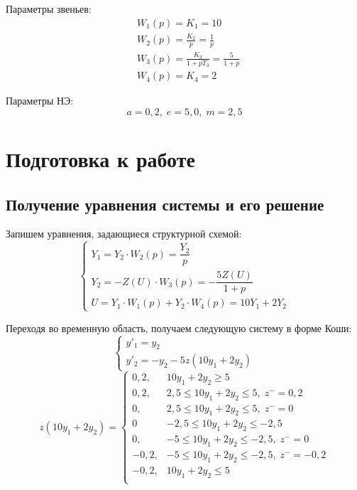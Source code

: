 	Параметры звеньев:
	\begin{align*}
		& W_1(p) = K_1 = 10 \\
		& W_2(p) = \frac{K_2}{p} = \frac{1}{p} \\
		& W_3(p) = \frac{K_3}{1+pT_3} = \frac{5}{1+p} \\
		& W_4(p) = K_4 = 2
	\end{align*}
	
	Параметры НЭ:
	\begin{equation*}
		a = 0,2,\;e=5,0,\;m=2,5
	\end{equation*}


	\section{Подготовка к работе}
	\subsection{Получение уравнения системы и его решение}
	
	Запишем уравнения, задающиеся структурной схемой:
	\begin{equation*}
		\begin{cases}
			Y_1 = Y_2\cdot W_2(p) = \dfrac{Y_2}{p} \\
			Y_2 = -Z(U)\cdot W_3(p) = -\dfrac{5 Z(U)}{1+p} \\
			U = Y_1\cdot W_1(p) + Y_2 \cdot W_4(p) = 10Y_1 + 2Y_2
		\end{cases}
	\end{equation*}

	Переходя во временную область, получаем следующую систему в форме Коши:
	\begin{equation}
		\begin{cases}
			y'_1 = y_2 \\
			y'_2 = -y_2 - 5z(10y_1 + 2y_2)
		\end{cases}
		\label{coshi}
	\end{equation}
	\begin{equation*}
		z(10y_1+2y_2) = 
		\begin{cases}
			0,2, & 10y_1+2y_2 \geq 5 \\
			0,2, & 2,5 \leq 10y_1+2y_2 \leq 5,\;z^{-} = 0,2 \\
			0, & 2,5 \leq 10y_1+2y_2 \leq 5,\;z^{-} = 0 \\
			0 & -2,5 \leq 10y_1+2y_2 \leq -2,5\\
			0, & -5 \leq 10y_1+2y_2 \leq -2,5,\;z^{-} = 0 \\
			-0,2, & -5 \leq 10y_1+2y_2 \leq -2,5,\;z^{-} = -0,2 \\
			-0,2, & 10y_1+2y_2 \leq 5 \\
		\end{cases}
	\end{equation*}
	
